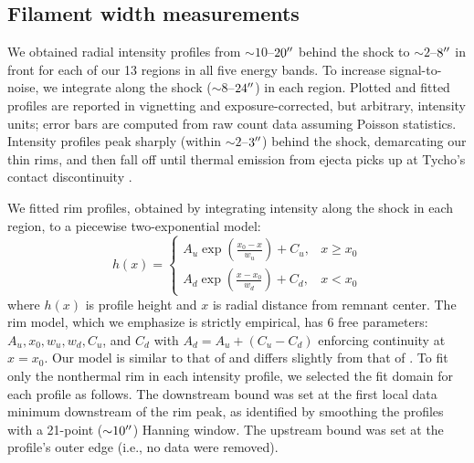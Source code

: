 \documentclass[iop, apj, numberedappendix, twocolappendix]{emulateapj}
\newcommand*{\abt}{\mathord{\sim}} %
\begin{document}
\subsection{Filament width measurements}
\label{sec:fwhms}

We obtained radial intensity profiles from $\abt 10$--$20\mbox{$^{\prime\prime}$}$ behind the
shock to $\abt 2$--$8\mbox{$^{\prime\prime}$}$ in front for each of our 13 regions in all five
energy bands.  To increase signal-to-noise, we integrate along the shock ($\abt
8$--$24\mbox{$^{\prime\prime}$}$) in each region.  Plotted and fitted profiles are reported in
vignetting and exposure-corrected, but arbitrary, intensity units; error bars
are computed from raw count data assuming Poisson statistics.  Intensity
profiles peak sharply (within $\abt 2$--$3\mbox{$^{\prime\prime}$}$) behind the shock,
demarcating our thin rims, and then fall off until thermal emission from ejecta
picks up at Tycho's contact discontinuity \citep{warren2005}.

We fitted rim profiles, obtained by integrating intensity along the shock in
each region, to a piecewise two-exponential model:
\begin{equation} \label{eq:prof}
    h(x) =
    \begin{cases}
        A_u \exp \left(\frac{x_0 - x}{w_u}\right) + C_u, &x \geq x_0 \\
        A_d \exp \left(\frac{x - x_0}{w_d}\right) + C_d, &x < x_0
    \end{cases}
\end{equation}
where $h(x)$ is profile height and $x$ is radial distance from remnant center.
The rim model, which we emphasize is strictly empirical, has 6 free parameters:
$A_u, x_0, w_u, w_d, C_u$, and $C_d$ with $A_d = A_u + (C_u - C_d)$ enforcing
continuity at $x=x_0$. Our model is similar to that of \citet{bamba2003,
bamba2005-hist} and differs slightly from that of .
To fit only the nonthermal rim in each intensity profile, we selected the fit
domain for each profile as follows.  The downstream bound was set at the first
local data minimum downstream of the rim peak, as identified by smoothing the
profiles with a 21-point ($\abt 10\arcsec$) Hanning window.  The upstream bound
was set at the profile's outer edge (i.e., no data were removed).
\end{document}
